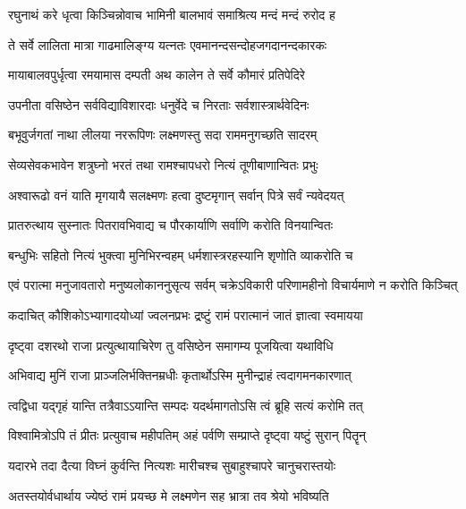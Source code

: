 \twolineshloka
{रघुनाथं करे धृत्वा किञ्चिन्नोवाच भामिनी}
{बालभावं समाश्रित्य मन्दं मन्दं रुरोद ह} %

\twolineshloka
{ते सर्वे लालिता मात्रा गाढमालिङ्ग्य यत्नतः}
{एवमानन्दसन्दोहजगदानन्दकारकः} %

\twolineshloka
{मायाबालवपुर्धृत्वा रमयामास दम्पती}
{अथ कालेन ते सर्वे कौमारं प्रतिपेदिरे} %

\twolineshloka
{उपनीता वसिष्ठेन सर्वविद्याविशारदाः}
{धनुर्वेदे च निरताः सर्वशास्त्रार्थवेदिनः} %

\twolineshloka
{बभूवुर्जगतां नाथा लीलया नररूपिणः}
{लक्ष्मणस्तु सदा राममनुगच्छति सादरम्} %

\twolineshloka
{सेव्यसेवकभावेन शत्रुघ्नो भरतं तथा}
{रामश्चापधरो नित्यं तूणीबाणान्वितः प्रभुः} %

\twolineshloka
{अश्वारूढो वनं याति मृगयायै सलक्ष्मणः}
{हत्वा दुष्टमृगान् सर्वान् पित्रे सर्वं न्यवेदयत्} %

\twolineshloka
{प्रातरुत्थाय सुस्नातः पितरावभिवाद्य च}
{पौरकार्याणि सर्वाणि करोति विनयान्वितः} %

\twolineshloka
{बन्धुभिः सहितो नित्यं भुक्त्वा मुनिभिरन्वहम्}
{धर्मशास्त्ररहस्यानि शृणोति व्याकरोति च} %

\fourlineindentedshloka
{एवं परात्मा मनुजावतारो}
{मनुष्यलोकाननुसृत्य सर्वम्}
{चक्रेऽविकारी परिणामहीनो}
{विचार्यमाणे न करोति किञ्चित्} %




\twolineshloka
{कदाचित् कौशिकोऽभ्यागादयोध्यां ज्वलनप्रभः}
{द्रष्टुं रामं परात्मानं जातं ज्ञात्वा स्वमायया} %

\twolineshloka
{दृष्ट्वा दशरथो राजा प्रत्युत्थायाचिरेण तु}
{वसिष्ठेन समागम्य पूजयित्वा यथाविधि} %

\twolineshloka
{अभिवाद्य मुनिं राजा प्राञ्जलिर्भक्तिनम्रधीः}
{कृतार्थोऽस्मि मुनीन्द्राहं त्वदागमनकारणात्} %

\twolineshloka
{त्वद्विधा यद्गृहं यान्ति तत्रैवाऽऽयान्ति सम्पदः}
{यदर्थमागतोऽसि त्वं ब्रूहि सत्यं करोमि तत्} %

\twolineshloka
{विश्वामित्रोऽपि तं प्रीतः प्रत्युवाच महीपतिम्}
{अहं पर्वणि सम्प्राप्ते दृष्ट्वा यष्टुं सुरान् पितॄन्} %

\twolineshloka
{यदारभे तदा दैत्या विघ्नं कुर्वन्ति नित्यशः}
{मारीचश्च सुबाहुश्चापरे चानुचरास्तयोः} %

\twolineshloka
{अतस्तयोर्वधार्थाय ज्येष्ठं रामं प्रयच्छ मे}
{लक्ष्मणेन सह भ्रात्रा तव श्रेयो भविष्यति} %

